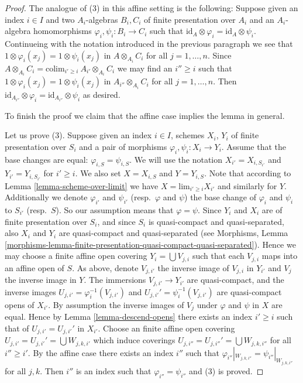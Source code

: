 \begin{proof}
\medskip\noindent
The analogue of (3) in this affine setting is the following:
Suppose given an index $i \in I$ and two $A_i$-algebras
$B_i, C_i$ of finite presentation over $A_i$ and an $A_i$-algebra
homomorphisms $\varphi_i, \psi_i : B_i \to C_i$ such that
$\text{id}_A \otimes \varphi_i = \text{id}_A \otimes \psi_i$.
Continueing with the notation introduced in the previous paragraph
we see that $1 \otimes \varphi_i(x_j) = 1 \otimes \psi_i(x_j)$
in $A \otimes_{A_i} C_i$ for all $j = 1, \ldots, n$. Since
$A \otimes_{A_i} C_i = \text{colim}_{i' \geq i}\ A_{i'} \otimes_{A_i} C_i$
we may find an $i'' \geq i$ such that
$1 \otimes \varphi_i(x_j) = 1 \otimes \psi_i(x_j)$
in $A_{i''} \otimes_{A_i} C_i$ for all $j = 1, \ldots, n$.
Then
$\text{id}_{A_{i''}} \otimes \varphi_i = \text{id}_{A_{i''}} \otimes \psi_i$
as desired.

\medskip\noindent
To finish the proof we claim that the affine case implies
the lemma in general.

\medskip\noindent
Let us prove (3). Suppose given an index $i \in I$, schemes
$X_i$, $Y_i$ of finite presentation over $S_i$ and a pair of morphisms
$\varphi_i, \psi_i : X_i \to Y_i$. Assume that the base changes are
equal: $\varphi_{i, S} = \psi_{i, S}$. We will use the notation
$X_{i'} = X_{i, S_{i'}}$ and $Y_{i'} = Y_{i, S_{i'}}$ for
$i' \geq i$. We also set $X = X_{i, S}$ and $Y = Y_{i, S}$.
Note that according to Lemma \ref{lemma-scheme-over-limit} we have
$X = \text{lim}_{i' \geq i} X_{i'}$ and similarly for $Y$.
Additionally we denote $\varphi_{i'}$ and $\psi_{i'}$
(resp.\ $\varphi$ and $\psi$)
the base change of $\varphi_i$ and $\psi_i$ to $S_{i'}$
(resp.\ $S$). So our assumption means that $\varphi = \psi$.
Since $Y_i$ and $X_i$ are of finite presentation
over $S_i$, and since $S_i$ is quasi-compact and quasi-separated, also
$X_i$ and $Y_i$ are quasi-compact and quasi-separated
(see Morphisms,
Lemma \ref{morphisms-lemma-finite-presentation-quasi-compact-quasi-separated}).
Hence we may choose a finite affine open covering
$Y_i = \bigcup V_{j, i}$ such that each $V_{j, i}$ maps into
an affine open of $S$. As above, denote $V_{j, i'}$ the inverse
image of $V_{j, i}$ in $Y_{i'}$ and $V_j$ the inverse image in $Y$.
The immersions $V_{j, i'} \to Y_{i'}$ are quasi-compact, and the inverse images
$U_{j, i'} = \varphi_i^{-1}(V_{j, i'})$ and
$U_{j, i'}' = \psi_i^{-1}(V_{j, i'})$
are quasi-compact opens of $X_{i'}$. By assumption the inverse images of
$V_j$ under $\varphi$ and $\psi$ in $X$ are equal.
Hence by Lemma \ref{lemma-descend-opens}
there exists an index $i' \geq i$ such that
of $U_{j, i'} = U_{j, i'}'$ in $X_{i'}$.
Choose an finite affine open covering
$U_{j, i'} = U_{j, i'}' = \bigcup W_{j, k, i'}$
which induce coverings $U_{j, i''} = U_{j, i''}' = \bigcup W_{j, k, i''}$
for all $i'' \geq i'$.
By the affine case there exists
an index $i''$ such that
$\varphi_{i''}|_{W_{j, k, i''}} = \psi_{i''}|_{W_{j, k, i''}}$
for all $j, k$. Then $i''$ is an index such that
$\varphi_{i''} = \psi_{i''}$ and (3) is proved.


\end{proof}
